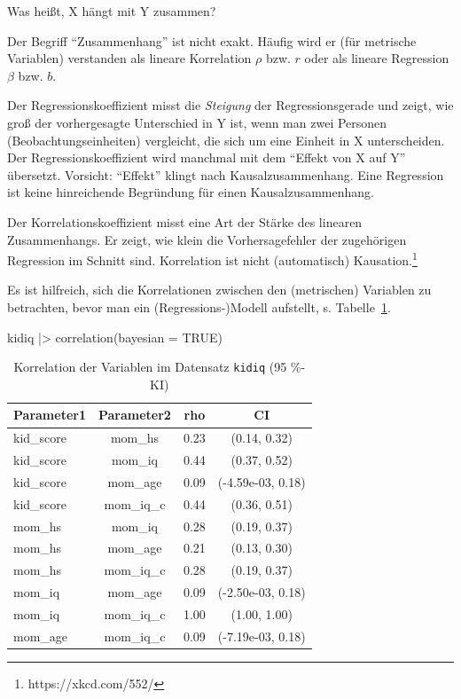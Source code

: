 \documentclass[
  ngerman,
  letterpaper,
  twoside,
  open=any]{scrbook}
\newenvironment{Shaded}{\begin{snugshade}}{\end{snugshade}}
\newcommand{\AttributeTok}[1]{\textcolor[rgb]{0.40,0.45,0.13}{#1}}
\newcommand{\ConstantTok}[1]{\textcolor[rgb]{0.56,0.35,0.01}{#1}}
\newcommand{\FunctionTok}[1]{\textcolor[rgb]{0.28,0.35,0.67}{#1}}
\newcommand{\NormalTok}[1]{\textcolor[rgb]{0.00,0.23,0.31}{#1}}
\newcommand{\SpecialCharTok}[1]{\textcolor[rgb]{0.37,0.37,0.37}{#1}}
\theoremstyle{definition}
\theoremstyle{plain}
\theoremstyle{definition}
\theoremstyle{definition}
\theoremstyle{definition}
\theoremstyle{definition}
\theoremstyle{remark}
\begin{document}
Was heißt, X hängt mit Y zusammen?

Der Begriff \enquote{Zusammenhang} ist nicht exakt. Häufig wird er (für
metrische Variablen) verstanden als lineare Korrelation \(\rho\) bzw.
\(r\) oder als lineare Regression \(\beta\) bzw. \(b\).

Der Regressionskoeffizient misst die \emph{Steigung} der
Regressionsgerade und zeigt, wie groß der vorhergesagte Unterschied in Y
ist, wenn man zwei Personen (Beobachtungseinheiten) vergleicht, die sich
um eine Einheit in X unterscheiden. Der Regressionskoeffizient wird
manchmal mit dem \enquote{Effekt von X auf Y} übersetzt. Vorsicht:
\enquote{Effekt} klingt nach Kausalzusammenhang. Eine Regression ist
keine hinreichende Begründung für einen Kausalzusammenhang.

Der Korrelationskoeffizient misst eine Art der Stärke des linearen
Zusammenhangs. Er zeigt, wie klein die Vorhersagefehler der zugehörigen
Regression im Schnitt sind. Korrelation ist nicht (automatisch)
Kausation.\footnote{https://xkcd.com/552/}

Es ist hilfreich, sich die Korrelationen zwischen den (metrischen)
Variablen zu betrachten, bevor man ein (Regressions-)Modell aufstellt,
s. Tabelle~\ref{tbl-cor-kidiq}.

\begin{Shaded}
\begin{Highlighting}[]
\NormalTok{kidiq }\SpecialCharTok{|\textgreater{}} 
  \FunctionTok{correlation}\NormalTok{(}\AttributeTok{bayesian =} \ConstantTok{TRUE}\NormalTok{)}
\end{Highlighting}
\end{Shaded}

{

\begin{longtable}[]{@{}lccc@{}}

\caption{\label{tbl-cor-kidiq}Korrelation der Variablen im Datensatz
\texttt{kidiq} (95 \%-KI)}

\tabularnewline

\toprule\noalign{}
Parameter1 & Parameter2 & rho & CI \\
\midrule\noalign{}
\endhead
\bottomrule\noalign{}
\endlastfoot
kid\_score & mom\_hs & 0.23 & (0.14, 0.32) \\
kid\_score & mom\_iq & 0.44 & (0.37, 0.52) \\
kid\_score & mom\_age & 0.09 & (-4.59e-03, 0.18) \\
kid\_score & mom\_iq\_c & 0.44 & (0.36, 0.51) \\
mom\_hs & mom\_iq & 0.28 & (0.19, 0.37) \\
mom\_hs & mom\_age & 0.21 & (0.13, 0.30) \\
mom\_hs & mom\_iq\_c & 0.28 & (0.19, 0.37) \\
mom\_iq & mom\_age & 0.09 & (-2.50e-03, 0.18) \\
mom\_iq & mom\_iq\_c & 1.00 & (1.00, 1.00) \\
mom\_age & mom\_iq\_c & 0.09 & (-7.19e-03, 0.18) \\

\end{longtable}

}
\end{document}
